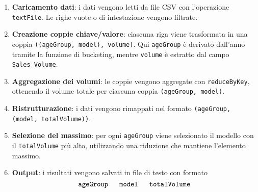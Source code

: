 		\begin{enumerate}
			\item \textbf{Caricamento dati}: i dati vengono letti da file CSV con l’operazione \texttt{textFile}.
			Le righe vuote o di intestazione vengono filtrate.
			
			\item \textbf{Creazione coppie chiave/valore}: ciascuna riga viene trasformata in una coppia \texttt{((ageGroup, model), volume)}.
			Qui \texttt{ageGroup} è derivato dall’anno tramite la funzione di bucketing, mentre \texttt{volume} è estratto dal campo \texttt{Sales\_Volume}.
			
			\item \textbf{Aggregazione dei volumi}: le coppie vengono aggregate con \texttt{reduceByKey}, ottenendo il volume totale per ciascuna coppia \texttt{(ageGroup, model)}.
			
			\item \textbf{Ristrutturazione}: i dati vengono rimappati nel formato \texttt{(ageGroup, (model, totalVolume))}.
			
			\item \textbf{Selezione del massimo}: per ogni \texttt{ageGroup} viene selezionato il modello con il \texttt{totalVolume} più alto, utilizzando una riduzione che mantiene l’elemento massimo.
			
			\item \textbf{Output}: i risultati vengono salvati in file di testo con formato
			\[
				\texttt{ageGroup \quad model \quad totalVolume}
			\]
		\end{enumerate}